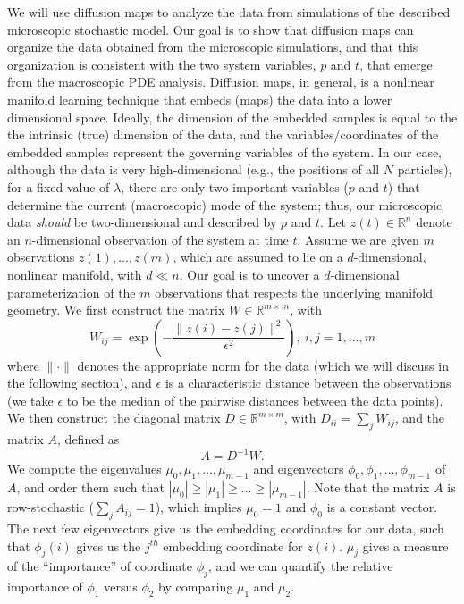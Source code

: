 \documentclass[prl, reprint, final, showkeys]{revtex4-1}
\begin{document}


We will use diffusion maps \cite{coifman2005geometric} to analyze the data from simulations of the described microscopic stochastic model.
%
Our goal is to show that diffusion maps can organize the data obtained from the microscopic simulations, and that this organization is consistent with the two system variables, $p$ and $t$, that emerge from the macroscopic PDE analysis.
%
Diffusion maps, in general, is a nonlinear manifold learning technique that embeds (maps) the data into a lower dimensional space. Ideally, the dimension of the embedded samples is equal to the the intrinsic (true) dimension of the data, and the variables/coordinates of the embedded samples represent the governing variables of the system.
%
In our case, although the data is very high-dimensional (e.g., the positions of all $N$ particles), for a fixed value of $\lambda$, there are only two important variables ($p$ and $t$) that determine the current (macroscopic) mode of the system; thus, our microscopic data {\em should} be two-dimensional and described by $p$ and $t$.
%
Let $z(t) \in \mathbb{R}^n$ denote an $n$-dimensional observation of the system at time $t$. Assume we are given $m$ observations $z(1), \dots, z(m)$, which are assumed to lie on a $d$-dimensional, nonlinear manifold, with $d \ll n$. Our goal is to uncover a $d$-dimensional parameterization of the $m$ observations that respects the underlying manifold geometry.
%
We first construct the matrix $W \in \mathbb{R}^{m \times m}$, with
\begin{equation} \label{eq:W}
W_{ij} = \exp \left( -\frac{\|z(i) - z(j) \|^2}{\epsilon^2} \right), \ i,j=1,\ldots,m
\end{equation}
where $\| \cdot \|$ denotes the appropriate norm for the data (which we will discuss in the following section), and $\epsilon$ is a characteristic distance between the observations (we take $\epsilon$ to be the median of the pairwise distances between the data points).
%
We then construct the diagonal matrix $D \in \mathbb{R}^{m \times m}$, with $D_{ii} = \sum_j W_{ij}$, and the matrix $A$, defined as
\begin{equation}
A = D^{-1} W.
\end{equation}
%
We compute the eigenvalues $\mu_0, \mu_1, \dots, \mu_{m-1}$ and eigenvectors $\phi_0, \phi_1, \dots, \phi_{m-1}$ of $A$, and order them such that $|\mu_0| \ge |\mu_1| \ge \dots \ge |\mu_{m-1}|$. 
%
Note that the matrix $A$ is row-stochastic ($\sum_j A_{ij} = 1$), which implies $\mu_0 = 1$ and $\phi_0$ is a constant vector.
%
The next few eigenvectors give us the embedding coordinates for our data, such that
$\phi_{j}(i)$ gives us the $j^{th}$ embedding coordinate for $z(i)$.
%
$\mu_j$ gives a measure of the ``importance'' of coordinate $\phi_j$,
and we can quantify the relative importance of $\phi_1$ versus $\phi_2$ by comparing $\mu_1$ and $\mu_2$.
\end{document}
